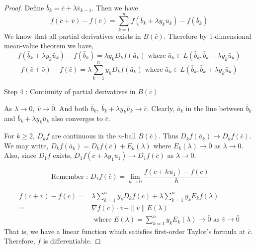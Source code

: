 \begin{proof}
Define $\bar{b}_k = \bar{c}+\lambda{}\bar{v}_{k-1}$.
Then we have
\begin{equation}
	f(\bar{c}+\bar{v}) - f(\bar{c}) = \sum_{k = 1}^n f(\bar{b}_k + \lambda{}y_k\bar{u}_k)-f(\bar{b}_k)
\end{equation}
We know that all partial derivatives exists in $B(\bar{c})$.
Therefore by 1-dimensional mean-value theorem we have,
\[ f(\bar{b}_k+\lambda{}y_k\bar{u}_k) - f(\bar{b}_k) = \lambda{}y_kD_kf(\bar{a}_k) \text{ where } \bar{a}_k \in L(\bar{b}_k,\bar{b}_k+\lambda{}y_k\bar{u}_k) \]
\begin{equation}
	f(\bar{c}+\bar{v}) - f(\bar{c}) = \lambda{} \sum_{k = 1}^n y_kD_kf(\bar{a}_k) \text{ where } \bar{a}_k \in L(\bar{b}_k,\bar{b}_k+\lambda{}y_k\bar{u}_k)
\end{equation}

Step 4 : Continuity of partial derivatives in $B(\bar{c})$

As $\lambda{} \to 0,\ \bar{v} \to \bar{0}$.
And both $\bar{b}_k,\ \bar{b}_k+\lambda{}y_k\bar{u}_k \to \bar{c}$.
Clearly, $\bar{a}_k$ in the line between $\bar{b}_k$ and $\bar{b}_k+\lambda{} y_k \bar{u}_k$ also converges to $\bar{c}$.

For $k \ge 2$, $D_kf$ are continuous in the $n$-ball $B(\bar{c})$.
Thus $D_kf(\bar{a}_k) \to D_kf(\bar{c})$.
We may write, $D_kf(\bar{a}_k) = D_kf(\bar{c}) + E_k(\lambda)$ where $E_k(\lambda) \to \bar{0}$ as $\lambda{} \to 0$.
Also, since $D_1 f$ exists, $D_1f(\bar{c}+\lambda{} y_1\bar{u}_1) \to D_1f(\bar{c})$ as $\lambda{} \to 0$.
\begin{commentary}
\[ \text{ Remember : } D_1 f(\bar{c}) = \lim_{h \to 0} \frac{f(\bar{c}+h\bar{u}_1) - f(\bar{c})}{h} \]
\end{commentary}
\begin{align*}
	f(\bar{c}+\bar{v}) - f(\bar{c}) = & \lambda{} \sum_{k = 1}^n y_kD_kf(\bar{c}) + \lambda{} \sum_{k = 1}^n y_kE_kf(\lambda{})\\
	= & \nabla f(\bar{c}) \cdot \bar{v} + \|\bar{v}\|E(\lambda) \\
	& \text{ where } E(\lambda{}) = \sum_{k = 1}^n y_k E_k(\lambda{}) \to \bar{0} \text{ as } \bar{v} \to \bar{0}
\end{align*}
That is, we have a linear function which satisfies first-order Taylor's formula at $\bar{c}$.
Therefore, $f$ is differentiable.
\end{proof}

